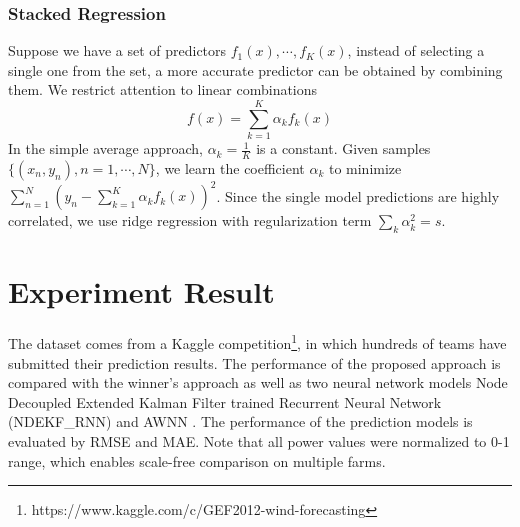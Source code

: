 \documentclass[conference]{IEEEtran}
\begin{document}
\subsubsection{Stacked Regression}
Suppose we have a set of predictors  $f_1(x), \cdots, f_K(x)$, instead of selecting a single one from the set, a more accurate predictor can be obtained by combining them. We restrict attention to linear combinations
\begin{equation}
    f(x) = \sum_{k=1}^K \alpha_k f_k(x)
\end{equation}
In the simple average approach, $\alpha_k = \frac{1}{K}$ is a constant. Given samples $\{(x_n,y_n),n=1,\cdots,N\}$, we learn the coefficient $\alpha_k$ to minimize $\sum_{n=1}^N (y_n - \sum_{k=1}^K \alpha_k f_k(x))^2$. Since the single model predictions are highly correlated, we use ridge regression with regularization term $\sum_k \alpha_k^2 = s$. %
%



\section{Experiment Result}
The dataset comes from a Kaggle competition\footnote{https://www.kaggle.com/c/GEF2012-wind-forecasting}, in which hundreds of teams have submitted their prediction results. The performance of the proposed approach is compared with the winner's approach \cite{SILVA2014395} as well as two neural network models Node Decoupled Extended Kalman Filter trained Recurrent Neural Network (NDEKF\_RNN) \cite{Kanna13} and AWNN \cite{7894735}. The performance of the prediction models is evaluated by RMSE and MAE. Note that all power values were normalized to 0-1 range, which enables scale-free comparison on multiple farms.
\end{document}
